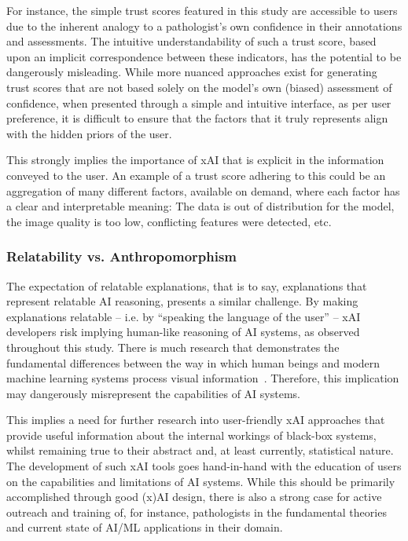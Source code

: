 For instance, the simple  trust scores featured in this study are accessible to users due to the inherent analogy to a pathologist's own confidence in their annotations and assessments. The intuitive understandability of such a trust score, based upon an implicit correspondence between these indicators, has the potential to be dangerously misleading. While more nuanced approaches exist for generating trust scores that are not based solely on the model's own (biased) assessment of confidence, when presented through a simple and intuitive interface, as per user preference, it is difficult to ensure that the factors that it truly represents align with the hidden priors of the user.

This strongly implies the importance of xAI that is explicit in the information conveyed to the user. An example of a trust score adhering to this could be an aggregation of many different factors, available on demand, where each factor has a clear and interpretable meaning: The data is out of distribution for the model, the image quality is too low, conflicting features were detected, etc. 

\subsubsection{Relatability vs. Anthropomorphism}

The expectation of relatable explanations, that is to say, explanations that represent relatable AI reasoning, presents a similar challenge. By making explanations relatable -- i.e. by ``speaking the language of the user'' -- xAI developers risk implying human-like reasoning of AI systems, as observed throughout this study. There is much research that demonstrates the fundamental differences between the way in which human beings and modern machine learning systems process visual information~\cite{geirhos2020shortcut}. Therefore, this implication may dangerously misrepresent the capabilities of AI systems.

This implies a need for further research into user-friendly xAI approaches that provide useful information about the internal workings of black-box systems, whilst remaining true to their abstract and, at least currently, statistical nature. The development of such xAI tools goes hand-in-hand with the education of users on the capabilities and limitations of AI systems. While this should be primarily accomplished through good (x)AI design, there is also a strong case for active outreach and training of, for instance, pathologists in the fundamental theories and current state of AI/ML applications in their domain.

